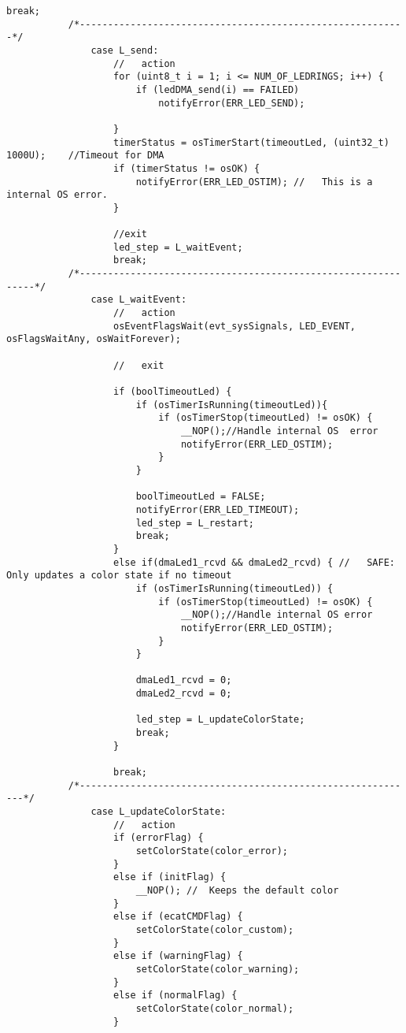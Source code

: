 \begin{lstlisting}[label=lst:led,caption={Main source code for LED DSM.}]
                   break;
           /*----------------------------------------------------------*/
               case L_send:
                   //	action
                   for (uint8_t i = 1; i <= NUM_OF_LEDRINGS; i++) {
                       if (ledDMA_send(i) == FAILED)
                           notifyError(ERR_LED_SEND);
   
                   }
                   timerStatus = osTimerStart(timeoutLed, (uint32_t) 1000U);	//Timeout for DMA
                   if (timerStatus != osOK) {
                       notifyError(ERR_LED_OSTIM); //	This is a internal OS error.
                   }
   
                   //exit
                   led_step = L_waitEvent;
                   break;
           /*--------------------------------------------------------------*/
               case	L_waitEvent:
                   //	action
                   osEventFlagsWait(evt_sysSignals, LED_EVENT, osFlagsWaitAny, osWaitForever);
   
                   //	exit
   
                   if (boolTimeoutLed) {
                       if (osTimerIsRunning(timeoutLed)){
                           if (osTimerStop(timeoutLed) != osOK) {
                               __NOP();//Handle internal OS  error
                               notifyError(ERR_LED_OSTIM);
                           }
                       }
   
                       boolTimeoutLed = FALSE;
                       notifyError(ERR_LED_TIMEOUT);
                       led_step = L_restart;
                       break;
                   }
                   else if(dmaLed1_rcvd && dmaLed2_rcvd) { //	SAFE: Only updates a color state if no timeout
                       if (osTimerIsRunning(timeoutLed)) {
                           if (osTimerStop(timeoutLed) != osOK) {
                               __NOP();//Handle internal OS error
                               notifyError(ERR_LED_OSTIM);
                           }
                       }
   
                       dmaLed1_rcvd = 0;
                       dmaLed2_rcvd = 0;
   
                       led_step = L_updateColorState;
                       break;
                   }
   
                   break;
           /*------------------------------------------------------------*/
               case	L_updateColorState:
                   //	action
                   if (errorFlag) {
                       setColorState(color_error);
                   }
                   else if (initFlag) {
                       __NOP();	//	Keeps the default color
                   }
                   else if (ecatCMDFlag) {
                       setColorState(color_custom);
                   }
                   else if (warningFlag) {
                       setColorState(color_warning);
                   }
                   else if (normalFlag) {
                       setColorState(color_normal);
                   }
   

\end{lstlisting}
